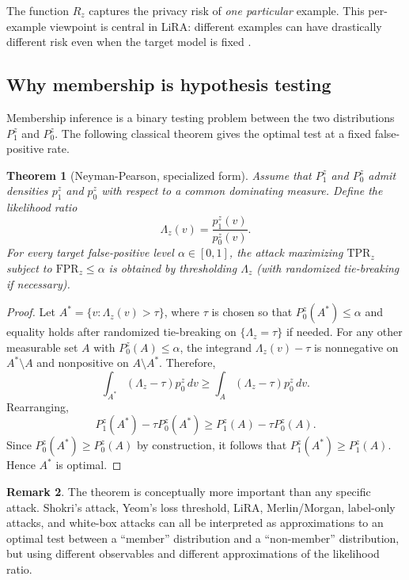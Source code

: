\documentclass[11pt]{article}
\newtheorem{theorem}{Theorem}[section]
\theoremstyle{definition}
\newtheorem{remark}[theorem]{Remark}
\newcommand{\1}{\mathbf{1}}
\newcommand{\TPR}{\mathrm{TPR}}
\newcommand{\FPR}{\mathrm{FPR}}
\begin{document}
The function $R_z$ captures the privacy risk of \emph{one particular} example. This per-example viewpoint is central in LiRA: different examples can have drastically different risk even when the target model is fixed \cite{carlini2022}.

\subsection{Why membership is hypothesis testing}

Membership inference is a binary testing problem between the two distributions $P_1^z$ and $P_0^z$. The following classical theorem gives the optimal test at a fixed false-positive rate.

\begin{theorem}[Neyman-Pearson, specialized form]
Assume that $P_1^z$ and $P_0^z$ admit densities $p_1^z$ and $p_0^z$ with respect to a common dominating measure. Define the likelihood ratio
\[
\Lambda_z(v) = \frac{p_1^z(v)}{p_0^z(v)}.
\]
For every target false-positive level $\alpha \in [0,1]$, the attack maximizing $\TPR_z$ subject to $\FPR_z \le \alpha$ is obtained by thresholding $\Lambda_z$ (with randomized tie-breaking if necessary).
\end{theorem}

\begin{proof}
Let $A^* = \{v : \Lambda_z(v) > \tau\}$, where $\tau$ is chosen so that $P_0^z(A^*) \le \alpha$ and equality holds after randomized tie-breaking on $\{\Lambda_z = \tau\}$ if needed. For any other measurable set $A$ with $P_0^z(A) \le \alpha$, the integrand $\Lambda_z(v)-\tau$ is nonnegative on $A^*\setminus A$ and nonpositive on $A\setminus A^*$. Therefore,
\[
\int_{A^*} (\Lambda_z-\tau) p_0^z \, dv \ge \int_A (\Lambda_z-\tau) p_0^z \, dv.
\]
Rearranging,
\[
P_1^z(A^*) - \tau P_0^z(A^*) \ge P_1^z(A) - \tau P_0^z(A).
\]
Since $P_0^z(A^*) \ge P_0^z(A)$ by construction, it follows that $P_1^z(A^*) \ge P_1^z(A)$. Hence $A^*$ is optimal.
\end{proof}

\begin{remark}
The theorem is conceptually more important than any specific attack. Shokri's attack, Yeom's loss threshold, LiRA, Merlin/Morgan, label-only attacks, and white-box attacks can all be interpreted as approximations to an optimal test between a ``member'' distribution and a ``non-member'' distribution, but using different observables and different approximations of the likelihood ratio.
\end{remark}
\end{document}
